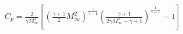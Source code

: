 \documentclass[10pt]{article}
\begin{document}
\begin{align*}C_{p}
=
\frac{2}{\gamma M_{\infty}^2}
\left[ 
\left( \frac{\gamma+1}{2} M_{\infty}^2 \right)^{\frac{\gamma}{\gamma-1} } 
\left(
\frac{ \gamma + 1 }{2 \gamma M_{\infty}^{2} - \gamma + 1}
\right)^{\frac{1}{\gamma-1}}
 -1 
\right]\end{align*}
\end{document}

